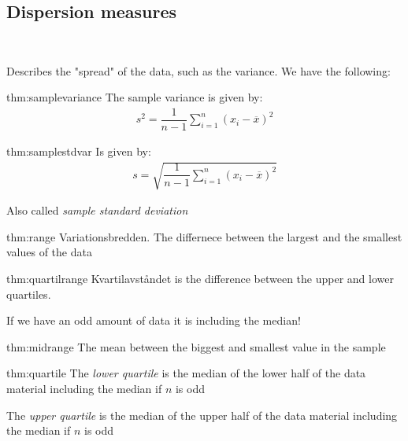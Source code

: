 \subsection{Dispersion measures}\hfill\\\par
\noindent Describes the "spread" of the data, such as the variance. We have the following:
\par\bigskip
\begin{theo}{thm:samplevariance}
  The sample variance is given by:
  \begin{equation*}
    \begin{gathered}
      s^2 = \dfrac{1}{n-1}\sum_{i=1}^{n}(x_i-\overline{x})^2
    \end{gathered}
  \end{equation*}
\end{theo}
\newpage
\begin{theo}{thm:samplestdvar}
  Is given by:
  \begin{equation*}
    \begin{gathered}
      s = \sqrt{\dfrac{1}{n-1}\sum_{i=1}^{n}(x_i-\overline{x})^2}
    \end{gathered}
  \end{equation*}
  \par\bigskip
  \noindent Also called \textit{sample standard deviation}
\end{theo}
\par\bigskip
\begin{theo}[Range]{thm:range}
  Variationsbredden. The differnece between the largest and the smallest values of the data 
\end{theo}
\par\bigskip
\begin{theo}{thm:quartilrange}
  Kvartilavståndet is the difference between the upper and lower quartiles.\par
  \noindent If we have an odd amount of data it is including the median!
\end{theo}
\par\bigskip
\begin{theo}{thm:midrange}
  The mean between the biggest and smallest value in the sample
\end{theo}
\par\bigskip
\begin{theo}{thm:quartile}
  The \textit{lower quartile} is the median of the lower half of the data material including the median if $n$ is odd
  \par\bigskip
  \noindent The \textit{upper quartile} is the median of the upper half of the data material including the median if $n$ is odd
\end{theo}
